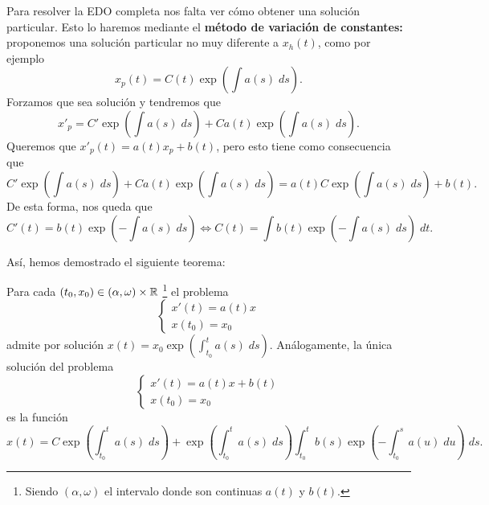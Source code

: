 \begin{observation}
Para resolver la EDO completa nos falta ver cómo obtener una solución particular. Esto lo haremos mediante el \textbf{método de variación de constantes:} proponemos una solución particular no muy diferente a $\displaystyle x_{h}\left(t\right) $, como por ejemplo
\[x_{p}\left(t\right) = C\left(t\right)\exp\left(\int a\left(s\right) \; d s\right) .\]
Forzamos que sea solución y tendremos que
\[x'_{p} = C'\exp\left(\int a\left(s\right) \; d s\right)+ Ca\left(t\right)\exp\left(\int a\left(s\right) \; d s\right) .\]
Queremos que $\displaystyle x'_{p}\left(t\right) = a\left(t\right)x_{p}+b\left(t\right) $, pero esto tiene como consecuencia que 
\[C'\exp\left(\int a\left(s\right) \; d s\right) + Ca\left(t\right)\exp\left(\int a\left(s\right) \; d s\right) = a\left(t\right)C\exp\left(\int a\left(s\right) \; d s\right) +b\left(t\right).\]
De esta forma, nos queda que 
\[C'\left(t\right) = b\left(t\right)\exp\left(-\int a\left(s\right) \; d s\right) \iff C\left(t\right)=\int b\left(t\right)\exp\left(-\int a\left(s\right) \; d s\right) \; dt .\]
\end{observation}
Así, hemos demostrado el siguiente teorema:
\begin{theorem}
Para cada $\displaystyle \left(t_{0}, x_{0}\right) \in \left(\alpha, \omega \right)\times \mathbb{R} $ \footnote{Siendo $\displaystyle \left(\alpha, \omega \right) $ el intervalo donde son continuas $\displaystyle a\left(t\right) $ y $\displaystyle b\left(t\right) $.} el problema
\[
\begin{cases}
x'\left(t\right)=a\left(t\right)x \\
x\left(t_{0}\right)=x_{0}
\end{cases}
\]
admite por solución $\displaystyle x\left(t\right)=x_{0}\exp\left(\int^{t}_{t_{0}} a\left(s\right) \; d s \right) $. Análogamente, la única solución del problema
\[
\begin{cases}
x'\left(t\right)= a\left(t\right)x + b\left(t\right) \\
x\left(t_{0}\right)=x_{0}
\end{cases}
\]
es la función
\[x\left(t\right)=C\exp\left(\int^{t}_{t_{0}} a\left(s\right) \; d s\right) + \exp\left(\int^{t}_{t_{0}} a\left(s\right) \; d s\right)\int^{t}_{t _{0}} b\left(s\right)\exp\left(-\int^{s}_{t_{0}} a\left(u\right) \; du\right) \; d s .\]
\end{theorem}

